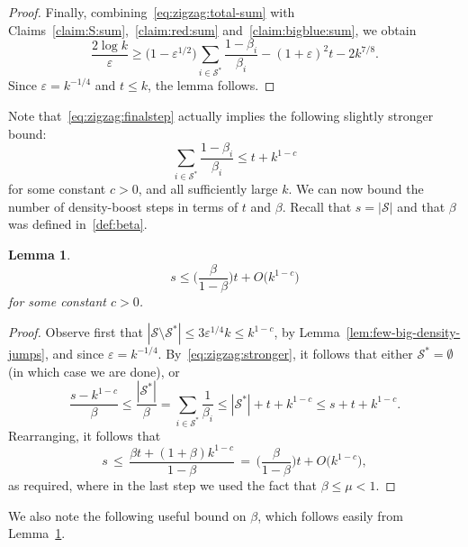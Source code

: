 \documentclass[12pt,reqno]{amsart}
\newtheorem{lemma}[theorem]{Lemma}
\theoremstyle{definition}
\theoremstyle{remark}
\newcommand\cB{\mathcal{B}}
\def\cS{\mathcal{S}}
\newcommand\eps{\varepsilon}
\renewcommand{\le}{\leqslant}
\renewcommand{\ge}{\geqslant}
\def\eps{\varepsilon}
\def\cD{\mathcal{D}}
\def\cB{\mathcal{B}}
\begin{document}
\begin{proof}

Finally, combining~\eqref{eq:zigzag:total-sum} with Claims~\ref{claim:S:sum},~\ref{claim:red:sum} and~\ref{claim:bigblue:sum}, %
we obtain  
\begin{equation}\label{eq:zigzag:finalstep}
\frac{2\log k}{\eps} \ge \big( 1 - \eps^{1/2} \big) \sum_{i \in \cS^*} \frac{1-\beta_i}{\beta_i} - (1+\eps)^2 t - 2k^{7/8}.
\end{equation}
Since $\eps = k^{-1/4}$ and $t \le k$, the lemma follows. 
\end{proof}

Note that~\eqref{eq:zigzag:finalstep} actually implies the following slightly stronger bound: 
\begin{equation}\label{eq:zigzag:stronger}
\sum_{i \in \cS^*} \frac{1 - \beta_i}{\beta_i} \le t + k^{1-c}
\end{equation}
for some constant $c > 0$, and all sufficiently large $k$. We can now bound the number of density-boost steps in terms of $t$ and $\beta$. Recall that $s = |\cS|$ and that $\beta$ was defined in~\eqref{def:beta}. 

\begin{lemma}\label{lem:s:bound}
\begin{equation}\label{eq:s:bound}
s \le \bigg( \frac{\beta}{1 - \beta} \bigg) t + O\big( k^{1-c} \big)
\end{equation}
for some constant $c > 0$. 
\end{lemma}

\begin{proof}
Observe first that $|\cS \setminus \cS^*| \le 3\eps^{1/4} k \le k^{1-c}$, by Lemma~\ref{lem:few-big-density-jumps}, and since $\eps = k^{-1/4}$. By~\eqref{eq:zigzag:stronger}, it follows that either $\cS^* = \emptyset$ (in which case we are done), or
$$\frac{s - k^{1-c}}{\beta} \le \frac{|\cS^*|}{\beta} = \sum_{i \in \cS^*} \frac{1}{\beta_i} \le |\cS^*| + t + k^{1-c} \le s + t + k^{1-c}.$$
Rearranging, it follows that
$$s \, \le \, \frac{\beta t + (1 + \beta)k^{1-c}}{1 - \beta} \, = \, \bigg( \frac{\beta}{1 - \beta} \bigg) t + O\big( k^{1-c} \big),$$
as required, where in the last step we used the fact that $\beta \le \mu < 1$. 
\end{proof}


We also note the following useful bound on $\beta$, which follows easily from Lemma~\ref{lem:s:bound}.
\end{document}
